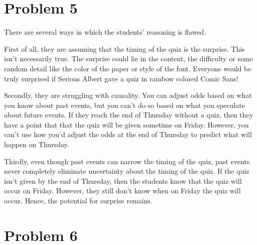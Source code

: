 \documentclass{article}
\begin{document}
\pagebreak

\section{Problem 5}
There are several ways in which the students' reasoning is flawed.

First of all, they are assuming that the timing of the quiz is the surprise. This isn't necessarily true. The surprise could lie in the content, the difficulty or some random detail like the color of the paper or style of the font. Everyone would be truly surprised if Serious Albert gave a quiz in rainbow colored Comic Sans!

Secondly, they are struggling with causality. You can adjust odds based on what you know about past events, but you can't do so based on what you speculate about future events.  If they reach the end of Thursday without a quiz, then they have a point that that the quiz will be given sometime on Friday. However, you can't use how you'd adjust the odds at the end of Thursday to predict what will happen on Thursday.

Thirdly, even though past events can narrow the timing of the quiz, past events never completely eliminate uncertainty about the timing of the quiz. If the quiz isn't given by the end of Thursday, then the students know that the quiz will occur on Friday. However, they still don't know when on Friday the quiz will occur. Hence, the potential for surprise remains.

\pagebreak

\section{Problem 6}
\end{document}
